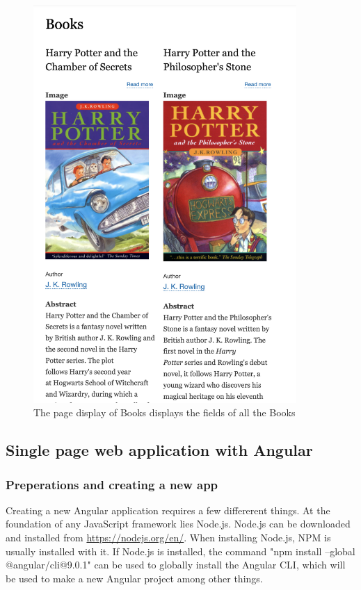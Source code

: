 \begin{figure}[h]
	\centering
	\includegraphics[width=10cm]{./img/Books_Page.png}
	\caption[Display of a list of Books]{The page display of Books displays the fields of all the Books}
	\label{fig:Books}
\end{figure}

\subsection{Single page web application with Angular}

\subsubsection{Preperations and creating a new app}

Creating a new Angular application requires a few differerent things. At the foundation of any JavaScript framework lies \gls{Node.js}. Node.js can be downloaded and installed from \url{https://nodejs.org/en/}. When installing Node.js, \gls{NPM} is usually installed with it. If Node.js is installed, the command "npm install --global @angular/cli@9.0.1" can be used to globally install the Angular CLI, which will be used to make a new Angular project among other things.

